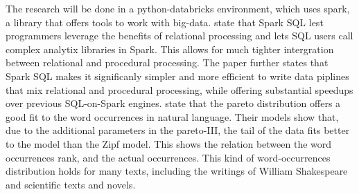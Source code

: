 \documentclass[../../Thesis.tex]{subfiles}
\begin{document}
The research will be done in a python-databricks environment, which uses spark, a library that offers tools to work with big-data. \citet{armbrust2015spark} state that Spark SQL lest programmers leverage the benefits of relational processing and lets SQL users call complex analytix libraries in Spark. This allows for much tighter intergration between relational and procedural processing. The paper further states that Spark SQL makes it significanly simpler and more efficient to write data piplines that mix relational and procedural processing, while offering substantial speedups over previous SQL-on-Spark engines.
\citet{wiegand2018word} state that the pareto distribution offers a good fit to the word occurrences in natural language. Their models show that, due to the additional parameters in the pareto-III, the tail of the data fits better to the model than the Zipf model. This shows the relation between the word occurrences rank, and the actual occurrences. This kind of word-occurrences distribution holds for many texts, including the writings of William Shakespeare and scientific texts and novels\cite{thurner2015understanding}.
\end{document}
